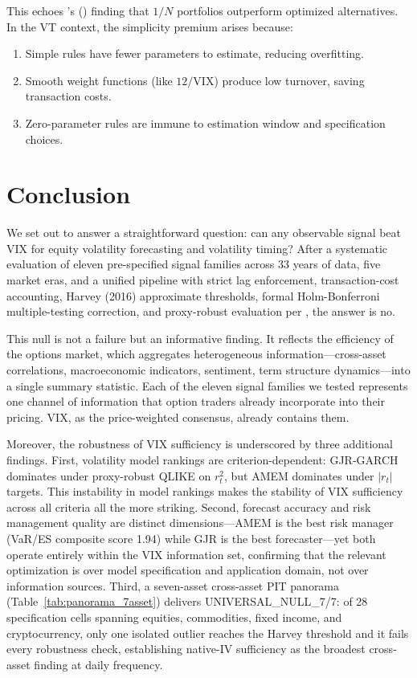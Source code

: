 \documentclass[12pt,a4paper]{article}
\begin{document}
This echoes \citeauthor{demiguel2009}'s (\citeyear{demiguel2009}) finding that $1/N$ portfolios outperform optimized alternatives. In the VT context, the simplicity premium arises because:
\begin{enumerate}
    \item Simple rules have fewer parameters to estimate, reducing overfitting.
    \item Smooth weight functions (like $12/\text{VIX}$) produce low turnover, saving transaction costs.
    \item Zero-parameter rules are immune to estimation window and specification choices.
\end{enumerate}


\section{Conclusion}
\label{sec:conclusion}

We set out to answer a straightforward question: can any observable signal beat VIX for equity volatility forecasting and volatility timing? After a systematic evaluation of eleven pre-specified signal families across 33 years of data, five market eras, and a unified pipeline with strict lag enforcement, transaction-cost accounting, Harvey (2016) approximate thresholds, formal Holm-Bonferroni multiple-testing correction, and proxy-robust evaluation per \citet{patton2011}, the answer is no.

This null is not a failure but an informative finding. It reflects the efficiency of the options market, which aggregates heterogeneous information---cross-asset correlations, macroeconomic indicators, sentiment, term structure dynamics---into a single summary statistic. Each of the eleven signal families we tested represents one channel of information that option traders already incorporate into their pricing. VIX, as the price-weighted consensus, already contains them.

Moreover, the robustness of VIX sufficiency is underscored by three additional findings. First, volatility model rankings are criterion-dependent: GJR-GARCH dominates under proxy-robust QLIKE on $r_t^2$, but AMEM dominates under $|r_t|$ targets. This instability in model rankings makes the stability of VIX sufficiency across all criteria all the more striking. Second, forecast accuracy and risk management quality are distinct dimensions---AMEM is the best risk manager (VaR/ES composite score 1.94) while GJR is the best forecaster---yet both operate entirely within the VIX information set, confirming that the relevant optimization is over model specification and application domain, not over information sources. Third, a seven-asset cross-asset PIT panorama (Table~\ref{tab:panorama_7asset}) delivers UNIVERSAL\_NULL\_7/7: of 28 specification cells spanning equities, commodities, fixed income, and cryptocurrency, only one isolated outlier reaches the Harvey threshold and it fails every robustness check, establishing native-IV sufficiency as the broadest cross-asset finding at daily frequency.
\end{document}

